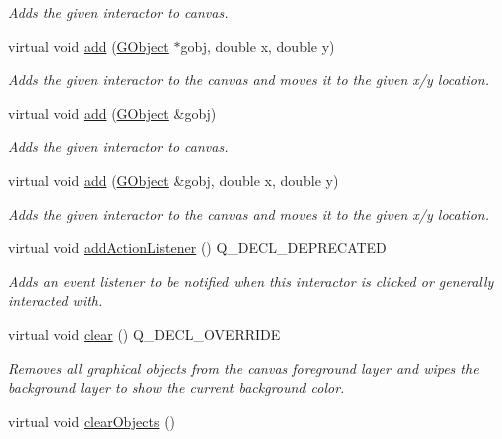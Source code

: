 \begin{DoxyCompactItemize}
\begin{DoxyCompactList}\small\item\em Adds the given interactor to canvas. \end{DoxyCompactList}\item 
virtual void \mbox{\hyperlink{classGCanvas_a8bb36f245efc7806414a1339c2befa1c}{add}} (\mbox{\hyperlink{classGObject}{G\+Object}} $\ast$gobj, double x, double y)
\begin{DoxyCompactList}\small\item\em Adds the given interactor to the canvas and moves it to the given x/y location. \end{DoxyCompactList}\item 
virtual void \mbox{\hyperlink{classGCanvas_ac732fc2123d7a6d7e2de145fe9bbd8e8}{add}} (\mbox{\hyperlink{classGObject}{G\+Object}} \&gobj)
\begin{DoxyCompactList}\small\item\em Adds the given interactor to canvas. \end{DoxyCompactList}\item 
virtual void \mbox{\hyperlink{classGCanvas_a5b11b532869632a6c26b098b0858eac5}{add}} (\mbox{\hyperlink{classGObject}{G\+Object}} \&gobj, double x, double y)
\begin{DoxyCompactList}\small\item\em Adds the given interactor to the canvas and moves it to the given x/y location. \end{DoxyCompactList}\item 
virtual void \mbox{\hyperlink{classGInteractor_a02f20ea6edfa0671f31c4c648a253833}{add\+Action\+Listener}} () Q\+\_\+\+D\+E\+C\+L\+\_\+\+D\+E\+P\+R\+E\+C\+A\+T\+ED
\begin{DoxyCompactList}\small\item\em Adds an event listener to be notified when this interactor is clicked or generally interacted with. \end{DoxyCompactList}\item 
virtual void \mbox{\hyperlink{classGCanvas_af220cadd1499c3586d48010a0348d9f8}{clear}} () Q\+\_\+\+D\+E\+C\+L\+\_\+\+O\+V\+E\+R\+R\+I\+DE
\begin{DoxyCompactList}\small\item\em Removes all graphical objects from the canvas foreground layer and wipes the background layer to show the current background color. \end{DoxyCompactList}\item 
virtual void \mbox{\hyperlink{classGCanvas_a6614e1320bc8e93b20df129613e5a0ff}{clear\+Objects}} ()

\end{DoxyCompactItemize}

